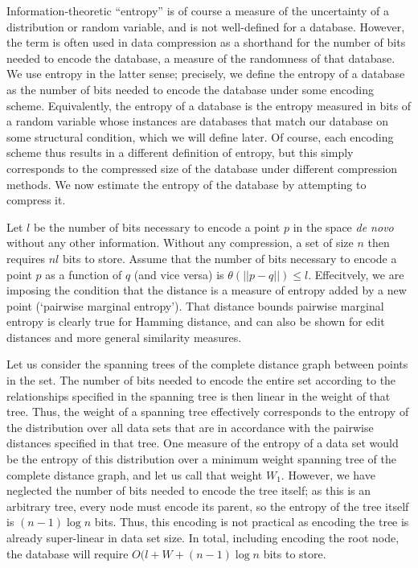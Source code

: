 \documentclass[review,preprint,12pt]{elsarticle}
\theoremstyle{definition}
\theoremstyle{remark}
\numberwithin{equation}{section}
\begin{document}
Information-theoretic ``entropy'' is of course a measure of the uncertainty of a distribution or random variable, and is not well-defined for a database.
However, the term is often used in data compression as a shorthand for the number of bits needed to encode the database, a measure of the randomness of that database.
We use entropy in the latter sense; precisely, we define the entropy of a database as the number of bits needed to encode the database under some encoding scheme.
Equivalently, the entropy of a database is the entropy measured in bits of a random variable whose instances are databases that match our database on some structural condition, which we will define later.
Of course, each encoding scheme thus results in a different definition of entropy, but this simply corresponds to the compressed size of the database under different compression methods.
We now estimate the entropy of the database by attempting to compress it.

Let $l$ be the number of bits necessary to encode a point $p$ in the space \textit{de novo} without any other information.
Without any compression, a set of size $n$ then requires $nl$ bits to store.
Assume that the number of bits necessary to encode a point $p$ as a function of $q$ (and vice versa) is $\theta(||p-q||) \le l$.
Effecitvely, we are imposing the condition that the distance is a measure of entropy added by a new point (`pairwise marginal entropy').
That distance bounds pairwise marginal entropy is clearly true for Hamming distance, and can also be shown for edit distances and more general similarity measures.

Let us consider the spanning trees of the complete distance graph between points in the set.
The number of bits needed to encode the entire set according to the relationships specified in the spanning tree is then linear in the weight of that tree.
Thus, the weight of a spanning tree effectively corresponds to the entropy of the distribution over all data sets that are in accordance with the pairwise distances specified in that tree.
One measure of the entropy of a data set would be the entropy of this distribution over a minimum weight spanning tree of the complete distance graph, and let us call that weight $W_1$.
However, we have neglected the number of bits needed to encode the tree itself; as this is an arbitrary tree, every node must encode its parent, so the entropy of the tree itself is $ (n-1) \log n$ bits.
Thus, this encoding is not practical as encoding the tree is already super-linear in data set size.
In total, including encoding the root node, the database will require $O(l + W + (n-1)\log n$ bits to store.
\end{document}
